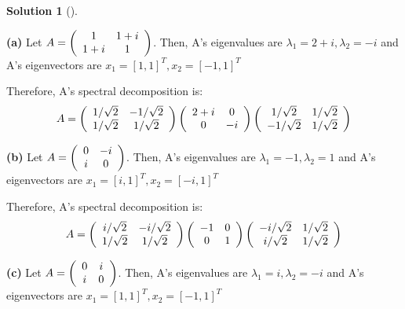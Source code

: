 \documentclass[numbers=enddot,12pt,final,onecolumn,notitlepage]{scrartcl}
\newcounter{sol}
\theoremstyle{definition}
\newtheorem{solu}[sol]{Solution}
\newenvironment{solution}[1][]
{\begin{solu}[#1]\begin{leftbar}}
        {\end{leftbar}\end{solu}}
\begin{document}
\begin{solution}
	\textbf{(a)} Let $A = \left(
		\begin{array}
				[c]{cc}%
				1   & 1+i \\
				1+i & 1
			\end{array}
		\right)$. Then, A's eigenvalues are $\lambda_1 = 2 + i, \lambda_2 = -i$ and A's eigenvectors are $x_1 = [1, 1]^{T}, x_2 = [-1, 1]^{T}$

	Therefore, A's spectral decomposition is:
	\[
		A = \left(\begin{array}
				[c]{cc}%
				1/\sqrt{2} & -1/\sqrt{2} \\
				1/\sqrt{2} & 1/\sqrt{2}
			\end{array}\right)
		\left(\begin{array}
				[c]{cc}%
				2 + i & 0  \\
				0     & -i
			\end{array}\right)
		\left(\begin{array}
				[c]{cc}%
				1/\sqrt{2}  & 1/\sqrt{2} \\
				-1/\sqrt{2} & 1/\sqrt{2}
			\end{array}\right)
	\]

	\textbf{(b)} Let $A = \left(
		\begin{array}
				[c]{cc}%
				0 & -i \\
				i & 0
			\end{array}
		\right)$. Then, A's eigenvalues are $\lambda_1 = -1, \lambda_2 = 1$ and A's eigenvectors are $x_1 = [i, 1]^{T}, x_2 = [-i, 1]^{T}$

	Therefore, A's spectral decomposition is:
	\[
		A = \left(\begin{array}
				[c]{cc}%
				i/\sqrt{2} & -i/\sqrt{2} \\
				1/\sqrt{2} & 1/\sqrt{2}
			\end{array}\right)
		\left(\begin{array}
				[c]{cc}%
				-1 & 0 \\
				0  & 1
			\end{array}\right)
		\left(\begin{array}
				[c]{cc}%
				-i/\sqrt{2} & 1/\sqrt{2} \\
				i/\sqrt{2}  & 1/\sqrt{2}
			\end{array}\right)
	\]

	\textbf{(c)} Let $A = \left(
		\begin{array}
				[c]{cc}%
				0 & i \\
				i & 0
			\end{array}
		\right)$. Then, A's eigenvalues are $\lambda_1 = i, \lambda_2 = -i$ and A's eigenvectors are $x_1 = [1, 1]^{T}, x_2 = [-1, 1]^{T}$


\end{solution}
\end{document}
